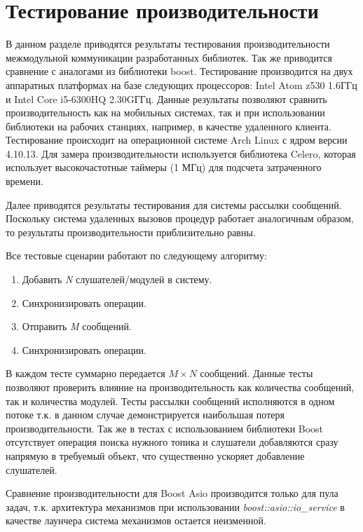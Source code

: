\section{Тестирование производительности}

В данном разделе приводятся результаты тестирования 
производительности межмодульной коммуникации разработанных 
библиотек. Так же приводится сравнение с аналогами из библиотеки 
boost. Тестирование производится на двух аппаратных платформах 
на базе следующих процессоров: Intel Atom z530 1.6ГГц и Intel 
Core i5-6300HQ 2.30GГГц. Данные результаты позволяют сравнить 
производительность как на мобильных системах, так и при 
использовании библиотеки на рабочих станциях, например, в 
качестве удаленного клиента. Тестирование происходит на 
операционной системе Arch Linux с ядром версии 4.10.13. Для 
замера производительности используется библиотека Celero, 
которая использует высокочастотные таймеры (1 МГц) для подсчета 
затраченного времени.

Далее приводятся результаты тестирования для системы рассылки сообщений. Поскольку система удаленных вызовов процедур работает аналогичным образом, то результаты производительности приблизительно равны.

Все тестовые сценарии работают по следующему алгоритму:

\begin{enumerate}
    \item Добавить \textit{N} слушателей/модулей в систему.
    \item Синхронизировать операции.
    \item Отправить \textit{M} сообщений.
    \item Синхронизировать операции.
\end{enumerate}

В каждом тесте суммарно передается $M \times N$ сообщений. 
Данные тесты позволяют проверить влияние на производительность 
как количества сообщений, так и количества модулей. Тесты 
рассылки сообщений исполняются в одном потоке т.к. в данном 
случае демонстрируется наибольшая потеря производительности. Так 
же в тестах с использованием библиотеки Boost отсутствует 
операция поиска нужного топика и слушатели добавляются сразу 
напрямую в требуемый объект, что существенно ускоряет добавление 
слушателей.

Сравнение производительности для Boost Asio производится только 
для пула задач, т.к. архитектура механизмов при использовании 
\textit{boost::asio::io\_service} в качестве лаунчера система 
механизмов остается неизменной.


